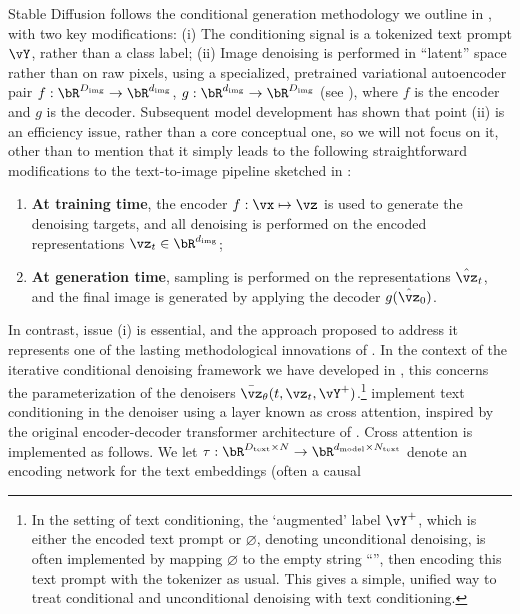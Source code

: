 \documentclass[../../book-main.tex]{subfiles}
\begin{document}
Stable Diffusion follows the conditional generation methodology we outline in
, with two key modifications: (i) The conditioning signal is a
tokenized text prompt $\vY$, rather than a class label; (ii) Image denoising is
performed in ``latent'' space rather than on raw pixels, using a specialized,
pretrained variational autoencoder pair $f : \bR^{D_{\mathrm{img}}} \to
\bR^{d_{\mathrm{img}}}$, $g : \bR^{d_{\mathrm{img}}} \to
\bR^{D_{\mathrm{img}}}$ (see ), where $f$
is the encoder and $g$ is the decoder. Subsequent model development has shown that
point (ii) is an efficiency issue, rather than a core conceptual one, so we will
not focus on it, other than to mention that it simply leads to the following
straightforward modifications to the text-to-image pipeline sketched in
: 
\begin{enumerate}
  \item \textbf{At training time},
    the encoder $f : \vx \mapsto \vz$ is used to generate the denoising targets, and
    all denoising is performed on the encoded representations $\vz_t \in
    \bR^{d_{\mathrm{img}}}$;
  \item \textbf{At generation time}, sampling is performed on the
    representations $\hat{\vz}_t$, and
    the final image is generated by applying the decoder $g(\hat{\vz}_0)$.
\end{enumerate}
In contrast, issue (i) is essential, and the approach proposed to address it
represents one of the lasting methodological innovations of
\textcite{rombach2022high}.
In the context of the iterative conditional denoising framework we have
developed in , this concerns the parameterization of the denoisers
$\bar{\vz}_{\theta}(t, \vz_t, \vY^+)$.\footnote{In the setting of text
conditioning, the `augmented' label $\vY^+$, which is either the encoded text
prompt or $\varnothing$, denoting unconditional denoising, is often implemented
by mapping $\varnothing$ to the empty string ``'', then encoding this text
prompt with the tokenizer as usual. This gives a simple, unified way to treat
conditional and unconditional denoising with text conditioning.}
\textcite{rombach2022high} implement text conditioning in the denoiser using
a layer known as cross attention, inspired by the original encoder-decoder
transformer architecture of \textcite{vaswani2017attention}. Cross attention is
implemented as follows. We let $\tau : \bR^{D_{\mathrm{text}} \times N} \to
\bR^{d_{\mathrm{model}} \times N_{\mathrm{text}}}$
denote an encoding network for the text embeddings (often a causal
\end{document}
